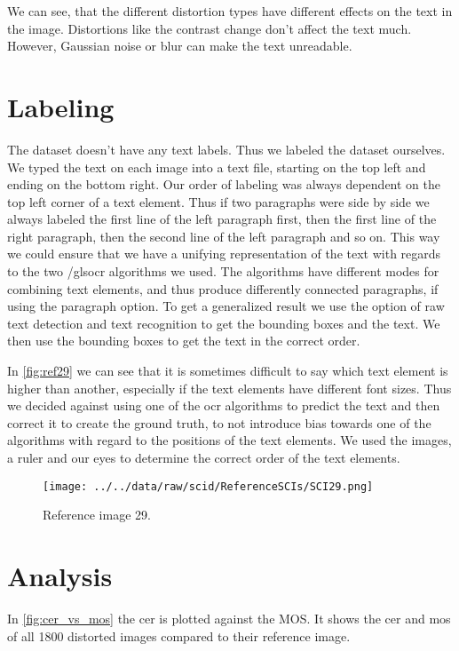 We can see, that the different distortion types have different effects on the text in the image.
Distortions like the contrast change don't affect the text much.
However, Gaussian noise or blur can make the text unreadable.

\section{Labeling}
\label{sec:dataset_labeling}

The dataset doesn't have any text labels.
Thus we labeled the dataset ourselves.
We typed the text on each image into a text file, starting on the top left and ending on the bottom right.
Our order of labeling was always dependent on the top left corner of a text element.
Thus if two paragraphs were side by side we always labeled the first line of the left paragraph first, then the first line of the right paragraph, then the second line of the left paragraph and so on.
This way we could ensure that we have a unifying representation of the text with regards to the two /gls{ocr} algorithms we used.
The algorithms have different modes for combining text elements, and thus produce differently connected paragraphs, if using the paragraph option.
To get a generalized result we use the option of raw text detection and text recognition to get the bounding boxes and the text.
We then use the bounding boxes to get the text in the correct order.

In \autoref{fig:ref29} we can see that it is sometimes difficult to say which text element is higher than another, especially if the text elements have different font sizes.
Thus we decided against using one of the \gls{ocr} algorithms to predict the text and then correct it to create the ground truth, to not introduce bias towards one of the algorithms with regard to the positions of the text elements.
We used the images, a ruler and our eyes to determine the correct order of the text elements.

\begin{figure}
    \centering
    \texttt{[image: ../../data/raw/scid/ReferenceSCIs/SCI29.png]}
    \caption{Reference image 29.}
    \label{fig:ref29}
\end{figure}

\section{Analysis}
\label{sec:dataset_analysis}

In \autoref{fig:cer_vs_mos} the cer is plotted against the MOS.
It shows the \gls{cer} and \gls{mos} of all 1800 distorted images compared to their reference image.

